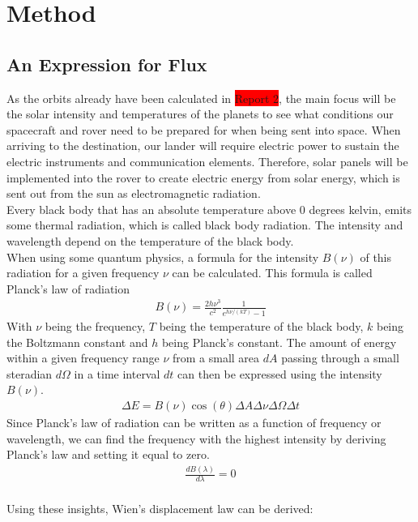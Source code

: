 \documentclass[reprint,english,notitlepage]{revtex4-2}
\begin{document}
\section{Method} \label{sec:method}
\subsection{An Expression for Flux}\label{subsec:an-expression-for-flux}
As the orbits already have been calculated in \colorbox{red}{Report 2}, the main focus will be the solar intensity and temperatures of the planets to see what conditions our spacecraft and rover need to be prepared for when being sent into space.
When arriving to the destination, our lander will require electric power to sustain the electric instruments and communication elements.
Therefore, solar panels will be implemented into the rover to create electric energy from solar energy, which is sent out from the sun as electromagnetic radiation.\\
Every black body that has an absolute temperature above 0 degrees kelvin, emits some thermal radiation, which is called black body radiation.
The intensity and wavelength depend on the temperature of the black body.\\
When using some quantum physics, a formula for the intensity $B(\nu)$ of this radiation for a given frequency $\nu$ can be calculated.
This formula is called Planck's law of radiation
\begin{align*}
    B(\nu) = \frac{2h\nu^3}{c^2}\frac{1}{e^{h\nu/(kT)}-1}
\end{align*}
With $\nu$ being the frequency, $T$ being the temperature of the black body, $k$ being the Boltzmann constant and $h$ being Planck's constant.
The amount of energy within a given frequency range $\nu$ from a small area $dA$ passing through a small steradian $d\Omega$ in a time interval $dt$ can then be expressed using the intensity $B(\nu)$.
\begin{align*}
    \Delta E = B(\nu) \cos\left(\theta\right) \Delta A \Delta\nu \Delta\Omega \Delta t
\end{align*}
Since Planck's law of radiation can be written as a function of frequency or wavelength, we can find the frequency with the highest intensity by deriving Planck's law and setting it equal to zero.
\begin{align*}
	\frac{dB(\lambda)}{d\lambda} = 0
\end{align*}\\
Using these insights, Wien's displacement law can be derived:
\end{document}
